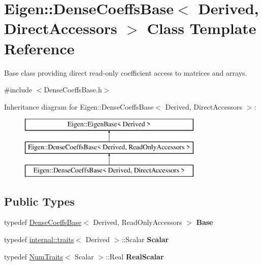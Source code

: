 \hypertarget{class_eigen_1_1_dense_coeffs_base_3_01_derived_00_01_direct_accessors_01_4}{}\section{Eigen\+::Dense\+Coeffs\+Base$<$ Derived, Direct\+Accessors $>$ Class Template Reference}
\label{class_eigen_1_1_dense_coeffs_base_3_01_derived_00_01_direct_accessors_01_4}


Base class providing direct read-\/only coefficient access to matrices and arrays.  




{\ttfamily \#include $<$Dense\+Coeffs\+Base.\+h$>$}

Inheritance diagram for Eigen\+::Dense\+Coeffs\+Base$<$ Derived, Direct\+Accessors $>$\+:\begin{figure}[H]
\begin{center}
\leavevmode
\includegraphics[height=3.000000cm]{class_eigen_1_1_dense_coeffs_base_3_01_derived_00_01_direct_accessors_01_4}
\end{center}
\end{figure}
\subsection*{Public Types}
\begin{DoxyCompactItemize}
\item 
\mbox{\label{class_eigen_1_1_dense_coeffs_base_3_01_derived_00_01_direct_accessors_01_4_a6a4e2f420a246c18de1869783acd757c}} 
typedef \mbox{\hyperlink{class_eigen_1_1_dense_coeffs_base}{Dense\+Coeffs\+Base}}$<$ Derived, Read\+Only\+Accessors $>$ {\bfseries Base}
\item 
\mbox{\label{class_eigen_1_1_dense_coeffs_base_3_01_derived_00_01_direct_accessors_01_4_ac30ce384a95fd47985a95a69901f2a83}} 
typedef \mbox{\hyperlink{struct_eigen_1_1internal_1_1traits}{internal\+::traits}}$<$ Derived $>$\+::Scalar {\bfseries Scalar}
\item 
\mbox{\label{class_eigen_1_1_dense_coeffs_base_3_01_derived_00_01_direct_accessors_01_4_aa8c5011e94b3e004c6064903f94a8a97}} 
typedef \mbox{\hyperlink{struct_eigen_1_1_num_traits}{Num\+Traits}}$<$ Scalar $>$\+::Real {\bfseries Real\+Scalar}
\end{DoxyCompactItemize}
